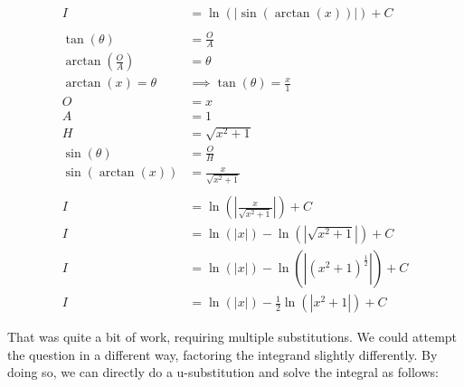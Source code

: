 \documentclass[12pt]{article}
\begin{document}
\begin{align}
    I                               & = \ln(|\sin(\arctan(x))|) + C                                                            \\
    \nonumber                                                                                                                  \\
    \tan(\theta)                    & = \frac{O}{A}                                                                            \\
    \arctan\left(\frac{O}{A}\right) & = \theta                                                                                 \\
    \arctan(x) = \theta             & \implies \tan(\theta) = \frac{x}{1}                                                      \\
    O                               & = x                                                                                      \\
    A                               & = 1                                                                                      \\
    H                               & = \sqrt{x^2+1}                                                                           \\
    \sin(\theta)                    & = \frac{O}{H}                                                                            \\
    \sin(\arctan(x))                & = \frac{x}{\sqrt{x^2+1}}                                                                 \\
    \nonumber                                                                                                                  \\
    I                               & = \ln\left(\left|\frac{x}{\sqrt{x^2+1}}\right|\right) + C                                \\
    I                               & = \ln(|x|) - \ln(|\sqrt{x^2+1}|) + C                                                     \\
    I                               & = \ln(|x|) - \ln(|(x^2+1)^{\frac{1}{2}}|) + C                                            \\
    I                               & = \ln(|x|) - \frac{1}{2}\ln(|x^2+1|) + C
\end{align}


That was quite a bit of work, requiring multiple substitutions. We could attempt the question in a different way, factoring the integrand slightly differently.
By doing so, we can directly do a u-substitution and solve the integral as follows:
\end{document}
